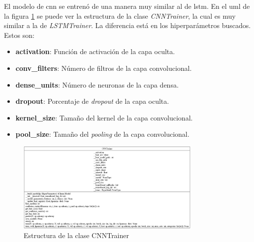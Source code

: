 El modelo de \gls{cnn} se entrenó de una manera muy similar al de \gls{lstm}. En el uml de la figura \ref{fig:cnn-estructura} se puede ver la estructura de la clase \textit{CNNTrainer}, la cual es muy similar a la de \textit{LSTMTrainer}. La diferencia está en los hiperparámetros buscados. Estos son:
\begin{itemize}
    \item \textbf{activation}: Función de activación de la capa oculta.
    \item \textbf{conv\_filters}: Número de filtros de la capa convolucional.
    \item \textbf{dense\_units}: Número de neuronas de la capa densa.
    \item \textbf{dropout}: Porcentaje de \textit{dropout} de la capa oculta.
    \item \textbf{kernel\_size}: Tamaño del kernel de la capa convolucional.
    \item \textbf{pool\_size}: Tamaño del \textit{pooling} de la capa convolucional.
\end{itemize}

\begin{figure}[H]
    \centering
    \includegraphics[width=0.8\textwidth]{Imagenes/Bitmap/classes_CNNTrainer.png}
    \caption{Estructura de la clase CNNTrainer}
    \label{fig:cnn-estructura}
\end{figure}

